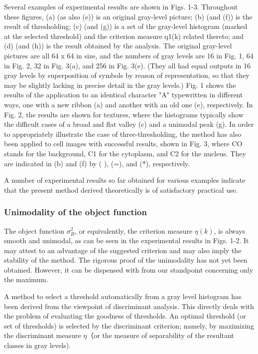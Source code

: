 Several examples of experimental results are shown in Figs. 1-3. Throughout these figures, (a) (as also (e)) is an original gray-level picture; (b) (and (f)) is the result of thresholding; (c) (and (g)) is a set of the gray-level histogram (marked at the selected threshold) and the criterion measure q1(k) related thereto; and (d) (and (h)) is the result obtained by the analysis. The original gray-level pictures are all 64 x 64 in size, and the numbers of gray levels are 16 in Fig. 1, 64 in Fig. 2, 32 in Fig. 3(a), and 256 in Fig. 3(e). (They all had equal outputs in 16 gray levels by superposition of symbols by reason of representation, so that they may be slightly lacking in precise detail in the gray levels.) Fig. 1 shows the results of the application to an identical character "A" typewritten in different ways, one with a new ribbon (a) and another with an old one (e), respectively. In Fig. 2, the results are shown for textures, where the histograms typically show the difficult cases of a broad and flat valley (c) and a unimodal peak (g). In order to appropriately illustrate the case of three-thresholding, the method has also been applied to cell images with successful results, shown in Fig. 3, where CO stands for the background, C1 for the cytoplasm, and C2 for the nucleus. They are indicated in (b) and (f) by ( ), (=), and (*), respectively.

A number of experimental results so far obtained for various
examples indicate that the present method derived theoretically is
of satisfactory practical use.

\subsubsection*{Unimodality of the object function}

The object function $\sigma_B^2$, or equivalently, the criterion measure $\eta(k)$, is always smooth and unimodal, as can be seen in the experimental results in Figs. 1-2. It may attest to an advantage of the suggested criterion and may also imply the stability of the method. The rigorous proof of the unimodality has not yet been obtained. However, it can be dispensed with from our standpoint concerning only the maximum.

A method to select a threshold automatically from a gray level histogram has been derived from the viewpoint of discriminant analysis. This directly deals with the problem of evaluating the goodness of thresholds. An optimal threshold (or set of thresholds) is selected by the discriminant criterion; namely, by maximizing the discriminant measure $\eta$（or the measure of separability of the resultant classes in gray levels).

